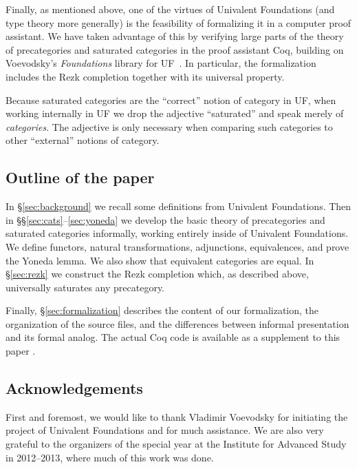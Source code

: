 \documentclass{mscs}
\numberwithin{equation}{section}
\begin{document}
Finally, as mentioned above, one of the virtues of Univalent Foundations (and type theory more generally) is the feasibility of formalizing it in a computer proof assistant.
We have taken advantage of this by verifying large parts of the theory of precategories and saturated categories in the proof assistant \textsf{Coq}, building on Voevodsky's \emph{Foundations} library for UF~\parencite{vv_foundations}.
In particular, the formalization includes the Rezk completion together with its universal property.

\begin{rmk}
  Because saturated categories are the ``correct'' notion of category in UF, when working internally in UF we drop the adjective ``saturated'' and speak merely of \emph{categories}.
  The adjective is only necessary when comparing such categories to other ``external'' notions of category.
\end{rmk}

\subsection*{Outline of the paper}

In \S\ref{sec:background} we recall some definitions from Univalent Foundations.
Then in \S\S\ref{sec:cats}--\ref{sec:yoneda} we develop the basic theory of precategories and saturated categories informally, working entirely inside of Univalent Foundations.
We define functors, natural transformations, adjunctions, equivalences, and prove the Yoneda lemma.
We also show that equivalent categories are equal.
In \S\ref{sec:rezk} we construct the Rezk completion which, as described above, universally saturates any precategory.

Finally, \S\ref{sec:formalization} describes the content of our formalization, the organization of the source files, and the differences between informal presentation and its formal analog.
The actual \textsf{Coq} code is available as a supplement to this paper \parencite{rezk_coq}.


\subsection*{Acknowledgements}
First and foremost, we would like to thank Vladimir Voevodsky for initiating the project of Univalent Foundations and for much assistance.
We are also very grateful to the organizers of the special year at the Institute for Advanced Study in 2012--2013, where much of this work was done.
\end{document}
